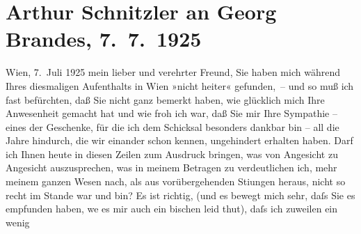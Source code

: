                \section[Arthur Schnitzler an Georg Brandes, 7. 7. 1925]{ Arthur Schnitzler an Georg Brandes, 7. 7. 1925}\nopagebreak{}\rehead{ }\begin{ledgroupsized}[t]{13cm}\normalsize\beginnumbering{} \toendnotes[C]{\smallbreak\pagebreak[2]} 
\toendnotes[C]{\smallbreak}\pstart
           \raggedleft{}{\pb}Wien, 7. Juli 1925\pend
           \pstart
           mein lieber und verehrter Freund, Sie haben mich während Ihres
               diesmaligen Aufenthalts in Wien »nicht heiter«
               gefunden, – und so muß ich fast befürchten, daß Sie nicht ganz bemerkt haben, wie
               glücklich mich Ihre Anwesenheit gemacht hat und wie froh ich war, daß Sie mir Ihre
               Sympathie – eines der Geschenke, für die ich dem Schicksal besonders dankbar bin –
               all die Jahre hindurch, die wir einander schon kennen, ungehindert erhalten haben.
               Darf ich Ihnen heute in diesen Zeilen zum Ausdruck bringen, was von Angesicht zu
               Angesicht auszusprechen, was in meinem Betragen zu verdeutlichen ich, mehr meinem
               ganzen Wesen nach, als aus vorübergehenden Sti{\geminationm}ungen
               heraus, nicht so recht im Stande war und bin? Es ist richtig, (und es bewegt mich
               sehr, daſs Sie es empfunden haben, we{\geminationn} es mir auch ein
               bischen leid thut), daſs ich {\pb}zuweilen ein wenig

\end{ledgroupsized}
